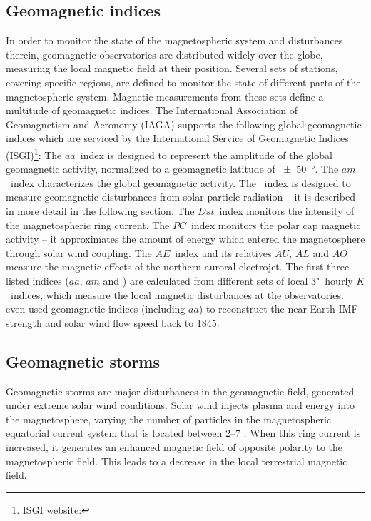 \subsection{Geomagnetic indices}
\label{sec:geomagnetic_indices}
In order to monitor the state of the magnetospheric system and disturbances therein, geomagnetic observatories are distributed widely over the globe, measuring the local magnetic field at their position. Several sets of stations, covering specific regions, are defined to monitor the state of different parts of the magnetospheric system. Magnetic measurements from these sets define a multitude of geomagnetic indices. The International Association of Geomagnetism and Aeronomy (IAGA) supports the following global geomagnetic indices which are serviced by the International Service of Geomagnetic Indices (ISGI)\footnote{ISGI website: }:
The $aa$~index is designed to represent the amplitude of the global geomagnetic activity, normalized to a geomagnetic latitude of \SI{+-50}{\degree}. The $am$~index characterizes the global geomagnetic activity. The \Kp{}~index is designed to measure geomagnetic disturbances from solar particle radiation -- it is described in more detail in the following section. The $Dst$~index monitors the intensity of the magnetospheric ring current. The $PC$~index monitors the polar cap magnetic activity -- it approximates the amount of energy which entered the magnetosphere through solar wind coupling. The $AE$~index and its relatives $AU$, $AL$ and $AO$ measure the magnetic effects of the northern auroral electrojet.
The first three listed indices ($aa$, $am$ and \Kp{}) are calculated from different sets of local 3"~hourly $K$~indices, which measure the local magnetic disturbances at the observatories.\\


\citet{Lockwood2014} even used geomagnetic indices (including $aa$) to reconstruct the near-Earth IMF strength and solar wind flow speed back to 1845.\\



\subsection{Geomagnetic storms}
\label{sec:geomagnetic_storms}
Geomagnetic storms are major disturbances in the geomagnetic field, generated under extreme solar wind conditions. Solar wind injects plasma and energy into the magnetosphere, varying the number of particles in the magnetospheric equatorial current system that is located between \SIrange{2}{7}{\RE} \citep{Gonzalez1994}. When this ring current is increased, it generates an enhanced magnetic field of opposite polarity to the magnetospheric field. This leads to a decrease in the local terrestrial magnetic field.

